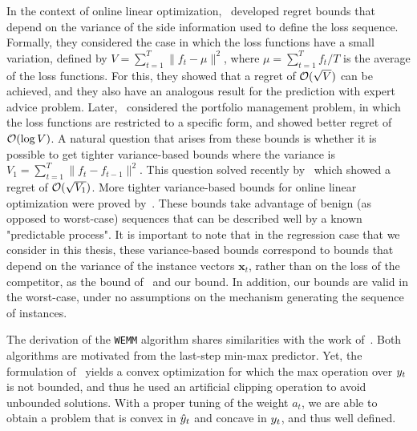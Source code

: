 In the context of online linear optimization,~\cite{DBLP:conf/colt/HazanK08} developed regret
bounds that depend on the variance of the side information used to define the loss sequence. Formally, they considered the case in
which the loss functions have a small variation, defined by $V=\sum_{t=1}^T \|f_t-\mu\|^2$, where $\mu=\sum_{t=1}^T f_t/T$ is the average of the loss functions. For this, they showed that a regret of ${\mathcal{O}}(\sqrt{V})$ can be achieved, and they also have an analogous result for the prediction with expert advice problem. Later,~\cite{HazanK09a} considered the portfolio management problem, in which the loss functions are restricted to a specific form, and showed better regret of ${\mathcal{O}}(\log{V})$. A natural question that arises from these bounds is whether it is possible to get tighter variance-based bounds where the variance is $V_1=\sum_{t=1}^T \|f_t-f_{t-1}\|^2$. This question solved recently by~\cite{DBLP:journals/jmlr/ChiangYLMLJZ12} which showed a regret of ${\mathcal{O}}(\sqrt{V_1})$. More tighter variance-based bounds for online linear optimization were proved by~\cite{DBLP:journals/corr/abs-1208-3728}. These bounds take advantage of benign (as opposed to worst-case) sequences that can be described well by a known "predictable process". It is important to note that in the regression case that we consider in this thesis, these variance-based bounds correspond to bounds that depend on the variance of the instance vectors $\mathbf{x}_t$, rather than on the loss of the competitor, as the bound of~\cite{OrabonaCBG12} and our bound. In addition, our bounds are valid in the worst-case, under no assumptions on the mechanism generating the sequence of instances.

The derivation of the \texttt{WEMM} algorithm shares similarities with the work of~\cite{Forster}. Both algorithms are motivated from the
last-step min-max predictor. Yet, the formulation of~\cite{Forster} yields a convex optimization for which the max
operation over $y_{t}$ is not bounded, and thus he used an
artificial clipping operation to avoid unbounded solutions. With a
proper tuning of the weight $a_t$, we are able to obtain a
problem that is convex in $\hat{y}_{t}$ and concave in $y_{t}$, and thus
well defined.

